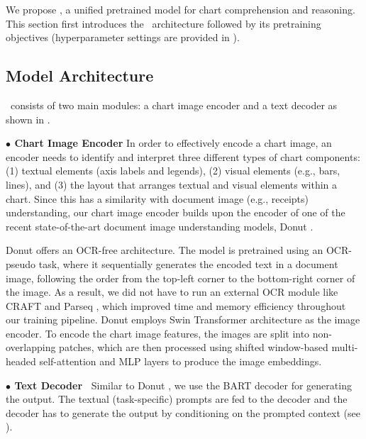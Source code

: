 
We propose \model, a unified pretrained model for chart comprehension and reasoning. This section first introduces the \model\ architecture followed by its pretraining objectives (hyperparameter settings are provided in ).
\vspace{-1mm}
\subsection{Model Architecture} \label{subsec:data2text}

\model\ consists of two main modules: a chart image encoder and a text decoder as shown in .


\noindent \textbf{$\bullet$ {Chart Image Encoder}}
In order to effectively encode a chart image, an encoder needs to identify and interpret three different types of chart components: (1) textual elements (axis labels and legends), (2) visual elements (e.g., bars, lines), and (3) the layout that arranges textual and visual elements within a chart. Since this has a similarity with document image (e.g., receipts) understanding, our chart image encoder builds upon the encoder of one of the recent state-of-the-art document image understanding models, Donut \cite{kim2022ocr}.

Donut offers an OCR-free architecture. The model is pretrained using an OCR-pseudo task, where it sequentially generates the encoded text in a document image, following the order from the top-left corner to the bottom-right corner of the image.
As a result, we did not have to run an external OCR module like CRAFT \cite{craft} and Parseq \cite{bautista2022parseq}, which improved time and memory efficiency throughout our training pipeline. Donut employs Swin Transformer \cite{liu2021swin} architecture as the image encoder. To encode the chart image features, 
the images are split into non-overlapping patches, which are then processed using shifted window-based multi-headed self-attention and MLP layers to produce the image embeddings.


\noindent \textbf{$\bullet$ {Text Decoder~}}
Similar to Donut \cite{kim2022ocr}, we use the BART \cite{bart} decoder for generating the output. The textual (task-specific) prompts are fed to the decoder and the decoder has to generate the output by conditioning on the prompted context  (see ).





 

